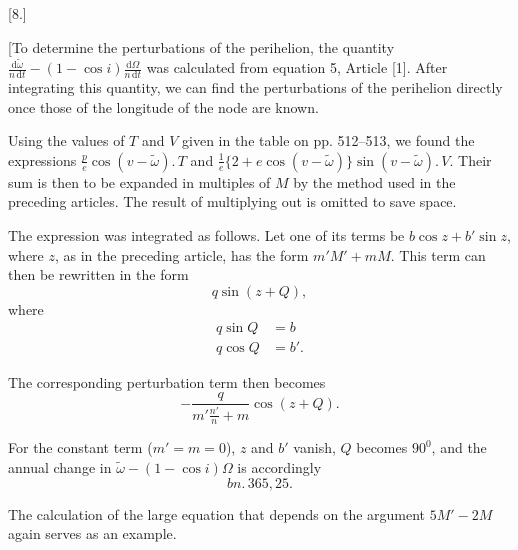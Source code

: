 \clearpage
\begin{landscape}
\begingroup
\fontsize{10}{13}\selectfont
{}
\renewcommand{\headrulewidth}{0pt}
\begin{center}[8.]\end{center}
\par\noindent\hspace*{\parindent}[To determine the perturbations of the perihelion, the quantity \(\frac{\mathrm{d}\tilde\omega}{n\,\mathrm{d}t}-(1-\cos i)\frac{\mathrm{d}\Omega}{n\,\mathrm{d}t}\) was calculated from equation 5, Article [1]. After integrating this quantity, we can find the perturbations of the perihelion directly once those of the longitude of the node are known.
\par\noindent\hspace*{\parindent}Using the values of \(T\) and \(V\) given in the table on pp. 512--513, we found the expressions \(\frac{p}{e}\cos(v-\tilde\omega)\mathord{.}\,T\) and \(\frac{1}{e}\{2+e\cos(v-\tilde\omega)\}\sin(v-\tilde\omega)\mathord{.}\,V\). Their sum is then to be expanded in multiples of \(M\) by the method used in the preceding articles. The result of multiplying out is omitted to save space.
\par\noindent\hspace*{\parindent}The expression was integrated as follows. Let one of its terms be \(b\cos z+b'\sin z\), where \(z\), as in the preceding article, has the form \(m'M'+mM\). This term can then be rewritten in the form
\[
q\sin(z+Q),
\]
\noindent where
\[
\begin{aligned}
q\sin Q&=b\\
q\cos Q&=b'.
\end{aligned}
\]
\par\noindent\hspace*{\parindent}The corresponding perturbation term then becomes
\[
-\frac{q}{m'\frac{n'}{n}+m}\cos(z+Q).
\]
\par\noindent\hspace*{\parindent}For the constant term (\(m'=m=0\)), \(z\) and \(b'\) vanish, \(Q\) becomes \(90^0\), and the annual change in \(\tilde\omega-(1-\cos i)\Omega\) is accordingly
\[
bn\mathord{.}\,365{,}25.
\]
\par\noindent\hspace*{\parindent}The calculation of the large equation that depends on the argument \(5M'-2M\) again serves as an example.

\end{landscape}
